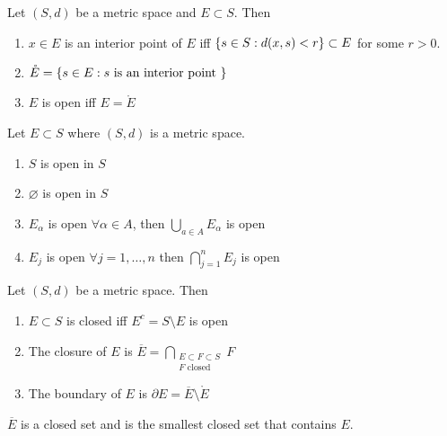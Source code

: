 \documentclass[../notes.tex]{subfiles}
\begin{document}
\begin{definition}[Openness]
    Let $(S, d)$ be a metric space and $E \subset S$. Then
    \begin{enumerate}
        \item $x \in E$ is an interior point of $E$ iff $\qty{s \in S : d(x,s) < r} \subset E$ for some $r > 0$.
        \item $\mathring{E} = \qty{s \in E : s \text{ is an interior point }}$
        \item $E$ is open iff $E = \mathring{E}$
    \end{enumerate}
\end{definition}

\begin{theorem}
    Let $E \subset S$ where $(S,d)$ is a metric space.
    \begin{enumerate}
        \item $S$ is open in $S$
        \item $\varnothing$ is open in $S$
        \item $E_\alpha$ is open $\forall \alpha \in A$, then $\bigcup_{a \in A} E_{\alpha}$ is open
        \item $E_j$ is open $\forall j = 1,\ldots,n$ then $\bigcap_{j = 1}^n E_j$ is open
    \end{enumerate}
\end{theorem}

\begin{definition}
    Let $(S, d)$ be a metric space. Then
    \begin{enumerate}
        \item $E \subset S$ is closed iff $E^c = S \setminus E$ is open
        \item The closure of $E$ is $\displaystyle\overline{E} = \bigcap_{\substack{E \subset F \subset S \\ F \text{ closed}}} F$
        \item The boundary of $E$ is $\partial E = \overline{E} \setminus \mathring{E}$ 
    \end{enumerate}
    \begin{remark}
        $\overline{E}$ is a closed set and is the smallest closed set that contains $E$.
    \end{remark}
\end{definition}
\end{document}
